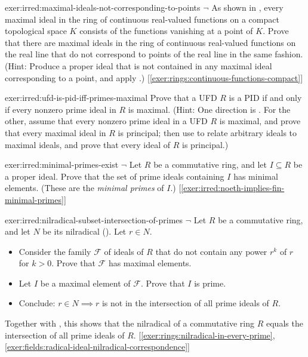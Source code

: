 \begin{exer}{}{exer:irred:maximal-ideals-not-corresponding-to-points}
  $\lnot$ As shown in ,
  every maximal ideal in the ring of continuous real-valued functions
  on a compact topological space $K$ consists of the functions
  vanishing at a point of $K$. Prove that there are maximal ideals in
  the ring of continuous real-valued functions on the real line that
  do not correspond to points of the real line in the same
  fashion. (Hint: Produce a proper ideal that is not contained in any
  maximal ideal corresponding to a point, and apply
  .)
  [\ref{exer:rings:continuous-functions-compact}]
\end{exer}

\begin{exer}{}{exer:irred:ufd-is-pid-iff-primes-maximal}
  Prove that a UFD $R$ is a PID if and only if every nonzero prime
  ideal in $R$ is maximal. (Hint: One direction is
  . For the other, assume that
  every nonzero prime ideal in a UFD $R$ is maximal, and prove that
  every maximal ideal in $R$ is principal; then use
   to relate arbitrary ideals to maximal ideals,
  and prove that every ideal of $R$ is principal.)
\end{exer}

\begin{exer}{}{exer:irred:minimal-primes-exist}
  $\lnot$ Let $R$ be a commutative ring, and let $I \subseteq R$ be a
  proper ideal. Prove that the set of prime ideals containing $I$ has
  minimal elements. (These are the \emph{minimal primes} of $I$.)
  [\ref{exer:irred:noeth-implies-fin-minimal-primes}]
\end{exer}

\begin{exer}{}{exer:irred:nilradical-subset-intersection-of-primes}
  $\lnot$ Let $R$ be a commutative ring, and let $N$ be its nilradical
  (). Let $r \in N$.
  \begin{itemize}
  \item Consider the family $\mathscr{F}$ of ideals of $R$ that do not
    contain any power $r^k$ of $r$ for $k > 0$. Prove that
    $\mathscr{F}$ has maximal elements.
  \item Let $I$ be a maximal element of $\mathscr{F}$. Prove that $I$
    is prime.
  \item Conclude: $r \in N \implies r$ is not in the intersection of
    all prime ideals of $R$.
  \end{itemize}
  Together with , this
  shows that the nilradical of a commutative ring $R$ equals the
  intersection of all prime ideals of $R$.
  [\ref{exer:rings:nilradical-in-every-prime},
  \ref{exer:fields:radical-ideal-nilradical-correspondence}]
\end{exer}

